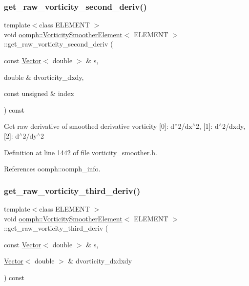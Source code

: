 \subsubsection{\texorpdfstring{get\+\_\+raw\+\_\+vorticity\+\_\+second\+\_\+deriv()}{get\_raw\_vorticity\_second\_deriv()}\hspace{0.1cm}{\footnotesize\ttfamily [2/2]}}
{\footnotesize\ttfamily template$<$class E\+L\+E\+M\+E\+NT $>$ \\
void \hyperlink{classoomph_1_1VorticitySmootherElement}{oomph\+::\+Vorticity\+Smoother\+Element}$<$ E\+L\+E\+M\+E\+NT $>$\+::get\+\_\+raw\+\_\+vorticity\+\_\+second\+\_\+deriv (\begin{DoxyParamCaption}\item[{const \hyperlink{classoomph_1_1Vector}{Vector}$<$ double $>$ \&}]{s,  }\item[{double \&}]{dvorticity\+\_\+dxdy,  }\item[{const unsigned \&}]{index }\end{DoxyParamCaption}) const\hspace{0.3cm}{\ttfamily [inline]}}

Get raw derivative of smoothed derivative vorticity \mbox{[}0\mbox{]}\+: d$^\wedge$2/dx$^\wedge$2, \mbox{[}1\mbox{]}\+: d$^\wedge$2/dxdy, \mbox{[}2\mbox{]}\+: d$^\wedge$2/dy$^\wedge$2 

Definition at line 1442 of file vorticity\+\_\+smoother.\+h.



References oomph\+::oomph\+\_\+info.

\mbox{\label{classoomph_1_1VorticitySmootherElement_aae5d2fb00a4107e1ec729a4e804ef5b1}} 
\subsubsection{\texorpdfstring{get\+\_\+raw\+\_\+vorticity\+\_\+third\+\_\+deriv()}{get\_raw\_vorticity\_third\_deriv()}\hspace{0.1cm}{\footnotesize\ttfamily [1/2]}}
{\footnotesize\ttfamily template$<$class E\+L\+E\+M\+E\+NT $>$ \\
void \hyperlink{classoomph_1_1VorticitySmootherElement}{oomph\+::\+Vorticity\+Smoother\+Element}$<$ E\+L\+E\+M\+E\+NT $>$\+::get\+\_\+raw\+\_\+vorticity\+\_\+third\+\_\+deriv (\begin{DoxyParamCaption}\item[{const \hyperlink{classoomph_1_1Vector}{Vector}$<$ double $>$ \&}]{s,  }\item[{\hyperlink{classoomph_1_1Vector}{Vector}$<$ double $>$ \&}]{dvorticity\+\_\+dxdxdy }\end{DoxyParamCaption}) const\hspace{0.3cm}{\ttfamily [inline]}}


